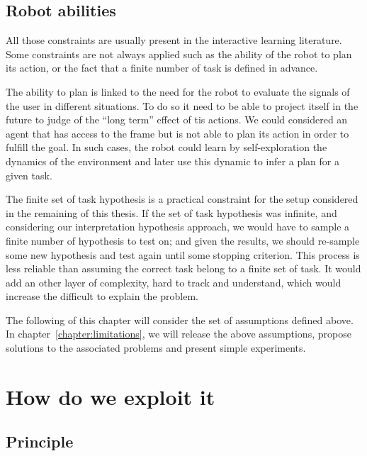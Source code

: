 

\subsection{Robot abilities}


\transition

All those constraints are usually present in the interactive learning literature. Some constraints are not always applied such as the ability of the robot to plan its action, or the fact that a finite number of task is defined in advance. 

The ability to plan is linked to the need for the robot to evaluate the signals of the user in different situations. To do so it need to be able to project itself in the future to judge of the ``long term'' effect of tis actions. We could considered an agent that has access to the frame but is not able to plan its action in order to fulfill the goal. In such cases, the robot could learn by self-exploration the dynamics of the environment and later use this dynamic to infer a plan for a given task.

The finite set of task hypothesis is a practical constraint for the setup considered in the remaining of this thesis. If the set of task hypothesis was infinite, and considering our interpretation hypothesis approach, we would have to sample a finite number of hypothesis to test on; and given the results, we should re-sample some new hypothesis and test again until some stopping criterion. This process is less reliable than assuming the correct task belong to a finite set of task. It would add an other layer of complexity, hard to track and understand, which would increase the difficult to explain the problem.

The following of this chapter will consider the set of assumptions defined above. In chapter~\ref{chapter:limitations}, we will release the above assumptions, propose solutions to the associated problems and present simple experiments.

\section{How do we exploit it}

\subsection{Principle}


